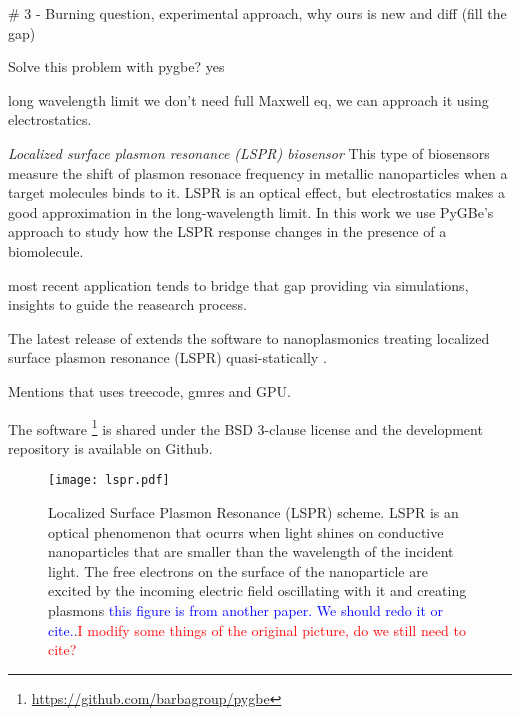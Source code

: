 # 3 - Burning question, experimental approach, why ours is new and diff (fill the gap)

Solve this problem with pygbe? yes

long wavelength limit we don't need full Maxwell eq, we can approach it using
electrostatics.

\item{\textit{Localized surface plasmon resonance (LSPR) biosensor} This type
of biosensors measure the shift of plasmon resonace frequency in metallic nanoparticles
when a target molecules binds to it. LSPR is an optical effect, but electrostatics 
makes a good approximation in the long-wavelength limit. In this work we use
PyGBe's approach to study how the LSPR response changes in the presence of a 
biomolecule.}


\pygbe most recent 
application \cite{ClementiETal2017} tends to bridge that gap providing via
simulations, insights to guide the reasearch process. 

The latest release of \pygbe
extends the software to nanoplasmonics treating localized surface plasmon 
resonance (LSPR) quasi-statically \cite{MayergoyzZhang2007}.

Mentions that uses treecode, gmres and GPU. 

The software \footnote{\url{https://github.com/barbagroup/pygbe}} is shared 
under the BSD 3-clause license and the development repository is available on 
Github.












\begin{figure}[h] %
   \centering
   \texttt{[image: lspr.pdf]} 
   \caption{Localized Surface Plasmon Resonance (LSPR) scheme. LSPR is an 
            optical phenomenon that ocurrs when light shines on conductive 
            nanoparticles that are smaller than the wavelength of the incident 
            light. The free electrons on the surface of the nanoparticle are 
            excited by the incoming electric field oscillating with it and 
            creating plasmons \textcolor{blue}{this figure is from another paper. We should redo it or cite.}.\textcolor{red}{I modify some things of the original picture, do we still need to cite?}}
   \label{fig:lspr}
\end{figure}




